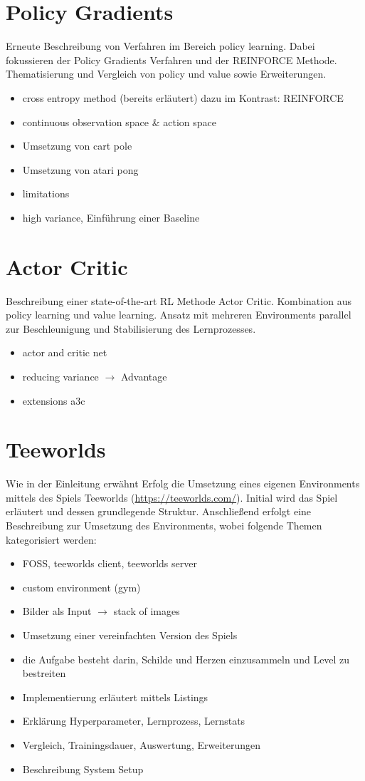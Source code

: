 \documentclass[11pt]{scrartcl}
\begin{document}
\section{Policy Gradients}
Erneute Beschreibung von Verfahren im Bereich policy learning. Dabei fokussieren der Policy Gradients Verfahren und der REINFORCE Methode. Thematisierung und Vergleich von policy und value sowie Erweiterungen.
\begin{itemize}
\itemsep0pt
\item cross entropy method (bereits erläutert) dazu im Kontrast: REINFORCE
\item continuous observation space \& action space
\item Umsetzung von cart pole
\item Umsetzung von atari pong
\item limitations
\item high variance, Einführung einer Baseline
\end{itemize}

\section{Actor Critic}
Beschreibung einer state-of-the-art RL Methode Actor Critic. Kombination aus policy learning und value learning. Ansatz mit mehreren Environments parallel zur Beschleunigung und Stabilisierung des Lernprozesses.
\begin{itemize}
\itemsep0pt
\item actor and critic net
\item reducing variance $\rightarrow$ Advantage
\item extensions a3c
\end{itemize}

\section{Teeworlds}
Wie in der Einleitung erwähnt Erfolg die Umsetzung eines eigenen Environments mittels des Spiels Teeworlds (\url{https://teeworlds.com/}). Initial wird das Spiel erläutert und dessen grundlegende Struktur. Anschließend erfolgt eine Beschreibung zur Umsetzung des Environments, wobei folgende Themen kategorisiert werden:
\begin{itemize}
\itemsep0pt	
\item FOSS, teeworlds client, teeworlds server
\item custom environment (gym)
\item Bilder als Input $\rightarrow$ stack of images
\item Umsetzung einer vereinfachten Version des Spiels
\item die Aufgabe besteht darin, Schilde und Herzen einzusammeln und Level zu bestreiten
\item Implementierung erläutert mittels Listings
\item Erklärung Hyperparameter, Lernprozess, Lernstats
\item Vergleich, Trainingsdauer, Auswertung, Erweiterungen
\item Beschreibung System Setup
\end{itemize}

\newpage


\newpage
\listoffigures 
\listoftables 
\end{document}
